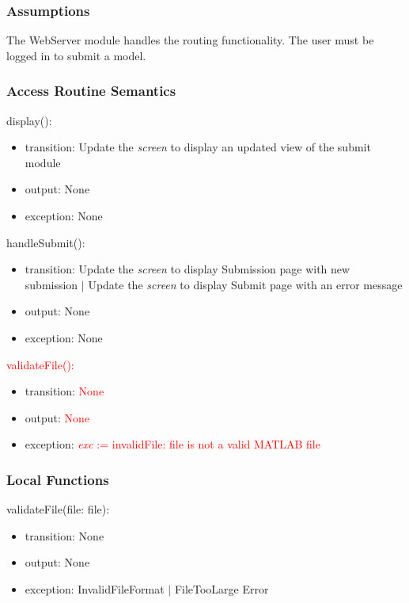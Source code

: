 \documentclass[12pt, titlepage]{article}
\begin{document}
\subsubsection{Assumptions}

The WebServer module handles the routing functionality.
The user must be logged in to submit a model.

\subsubsection{Access Routine Semantics}

\noindent display():
\begin{itemize}
\item transition: Update the \textit{screen} to display an updated view of the submit module
\item output: None
\item exception: None
\end{itemize}

\noindent handleSubmit():
\begin{itemize}
\item transition: Update the \textit{screen} to display Submission page with new submission $|$ Update the \textit{screen} to display Submit page with an error message
\item output: None
\item exception: None
\end{itemize}

\noindent \textcolor{red}{validateFile():}
\begin{itemize}
\item transition: \textcolor{red}{None}
\item output: \textcolor{red}{None}
\item exception: \textcolor{red}{\textit{exc} := invalidFile: file is not a valid MATLAB file}

\end{itemize}

\subsubsection{Local Functions}

\noindent validateFile(file: file):
\begin{itemize}
\item transition: None
\item output: None
\item exception: InvalidFileFormat $|$ FileTooLarge Error
\end{itemize}
\end{document}

